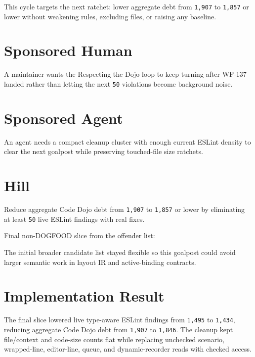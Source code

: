 This cycle targets the next ratchet: lower aggregate debt from \texttt{1\allowbreak{},\allowbreak{}9\allowbreak{}0\allowbreak{}7} to \texttt{1\allowbreak{},\allowbreak{}8\allowbreak{}5\allowbreak{}7} or lower without weakening rules, excluding files, or raising any baseline.

\section{Sponsored Human}\label{record-220-sponsored-human}

A maintainer wants the Respecting the Dojo loop to keep turning after WF-137 landed rather than letting the next \texttt{5\allowbreak{}0} violations become background noise.

\section{Sponsored Agent}\label{record-220-sponsored-agent}

An agent needs a compact cleanup cluster with enough current ESLint density to clear the next goalpost while preserving touched-file size ratchets.

\section{Hill}\label{record-220-hill}

Reduce aggregate Code Dojo debt from \texttt{1\allowbreak{},\allowbreak{}9\allowbreak{}0\allowbreak{}7} to \texttt{1\allowbreak{},\allowbreak{}8\allowbreak{}5\allowbreak{}7} or lower by eliminating at least \texttt{5\allowbreak{}0} live ESLint findings with real fixes.

Final non-DOGFOOD slice from the offender list:



The initial broader candidate list stayed flexible so this goalpost could avoid larger semantic work in layout IR and active-binding contracts.

\section{Implementation Result}\label{record-220-implementation-result}

The final slice lowered live type-aware ESLint findings from \texttt{1\allowbreak{},\allowbreak{}4\allowbreak{}9\allowbreak{}5} to \texttt{1\allowbreak{},\allowbreak{}4\allowbreak{}3\allowbreak{}4}, reducing aggregate Code Dojo debt from \texttt{1\allowbreak{},\allowbreak{}9\allowbreak{}0\allowbreak{}7} to \texttt{1\allowbreak{},\allowbreak{}8\allowbreak{}4\allowbreak{}6}. The cleanup kept file/context and code-size counts flat while replacing unchecked scenario, wrapped-line, editor-line, queue, and dynamic-recorder reads with checked access.

